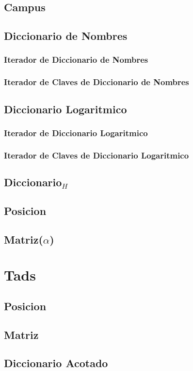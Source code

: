 \documentclass[a4paper,10pt, nofootinbib]{article}
\begin{document}
\subsection{Campus}

\newpage
\subsection{Diccionario de Nombres}

\newpage
\subsubsection{Iterador de Diccionario de Nombres}

\newpage
\subsubsection{Iterador de Claves de Diccionario de Nombres}


\newpage
\subsection{Diccionario Logaritmico}

\subsubsection{Iterador de Diccionario Logaritmico}

\subsubsection{Iterador de Claves de Diccionario Logaritmico}


\newpage
\subsection{Diccionario$_H$}

\clearpage
\subsection{Posicion}

\clearpage
\subsection{Matriz($\alpha$)}


\clearpage
\section{Tads}
\subsection{Posicion}

\clearpage
\subsection{Matriz}

\clearpage
\subsection{Diccionario Acotado}

\end{document}
